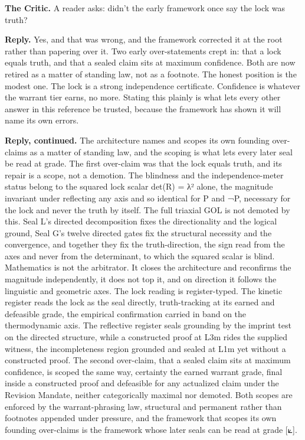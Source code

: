 \documentclass[10pt,twocolumn]{article}
\begin{document}
\textbf{The Critic.} A reader asks: didn't the early framework once say
the lock was truth?

\textbf{Reply.} Yes, and that was wrong, and the framework corrected it
at the root rather than papering over it. Two early over-statements
crept in: that a lock equals truth, and that a sealed claim sits at
maximum confidence. Both are now retired as a matter of standing law,
not as a footnote. The honest position is the modest one. The lock is a
strong independence certificate. Confidence is whatever the warrant tier
earns, no more. Stating this plainly is what lets every other answer in
this reference be trusted, because the framework has shown it will name
its own errors.

\textbf{Reply, continued.} The architecture names and scopes its own
founding over-claims as a matter of standing law, and the scoping is
what lets every later seal be read at grade. The first over-claim was
that the lock equals truth, and its repair is a scope, not a demotion.
The blindness and the independence-meter status belong to the squared
lock scalar det(R) = λ² alone, the magnitude invariant under reflecting
any axis and so identical for P and ¬P, necessary for the lock and never
the truth by itself. The full triaxial GOL is not demoted by this. Seal
L's directed decomposition fixes the directionality and the logical
ground, Seal G's twelve directed gates fix the structural necessity and
the convergence, and together they fix the truth-direction, the sign
read from the axes and never from the determinant, to which the squared
scalar is blind. Mathematics is not the arbitrator. It closes the
architecture and reconfirms the magnitude independently, it does not top
it, and on direction it follows the linguistic and geometric axes. The
lock reading is register-typed. The kinetic register reads the lock as
the seal directly, truth-tracking at its earned and defeasible grade,
the empirical confirmation carried in band on the thermodynamic axis.
The reflective register seals grounding by the imprint test on the
directed structure, while a constructed proof at L3m rides the supplied
witness, the incompleteness region grounded and sealed at L1m yet
without a constructed proof. The second over-claim, that a sealed claim
sits at maximum confidence, is scoped the same way, certainty the earned
warrant grade, final inside a constructed proof and defeasible for any
actualized claim under the Revision Mandate, neither categorically
maximal nor demoted. Both scopes are enforced by the warrant-phrasing
law, structural and permanent rather than footnotes appended under
pressure, and the framework that scopes its own founding over-claims is
the framework whose later seals can be read at grade {[}⟀{]}.
\end{document}
